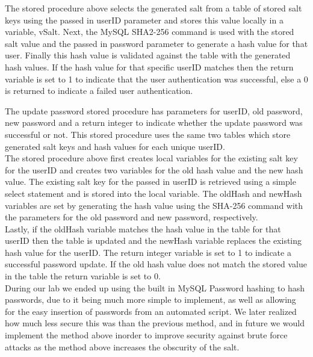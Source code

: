 \documentclass{article}
\begin{document}
The stored procedure above selects the generated salt from a table of stored salt keys using the passed in userID parameter and stores this value locally in a variable, vSalt. Next, the MySQL SHA2-256 command is used with the stored salt value and the passed in password parameter to generate a hash value for that user. Finally this hash value is validated against the table with the generated hash values. If the hash value for that specific userID matches then the return variable is set to 1 to indicate that the user authentication was successful, else a 0 is returned to indicate a failed user authentication.



The update password stored procedure has parameters for userID, old password, new password and a return integer to indicate whether the update password was successful or not. This stored procedure uses the same two tables which store generated salt keys and hash values for each unique userID. \\

The stored procedure above first creates local variables for the existing salt key for the userID and creates two variables for the old hash value and the new hash value. The existing salt key for the passed in userID is retrieved using a simple select statement and is stored into the local variable. The oldHash and newHash variables are set by generating the hash value using the SHA-256 command with the parameters for the old password and new password, respectively. \\

Lastly, if the oldHash variable matches the hash value in the table for that userID then the table is updated and the newHash variable replaces the existing hash value for the userID. The return integer variable is set to 1 to indicate a successful password update. If the old hash value does not match the stored value in the table the return variable is set to 0.\\

During our lab we ended up using the built in MySQL Password hashing to hash passwords, due to it being much more simple to implement, as well as allowing for the easy insertion of passwords from an automated script. We later realized how much less secure this was than the previous method, and in future we would implement the method above inorder to improve security against brute force attacks as the method above increases the obscurity of the salt. 
\end{document}
